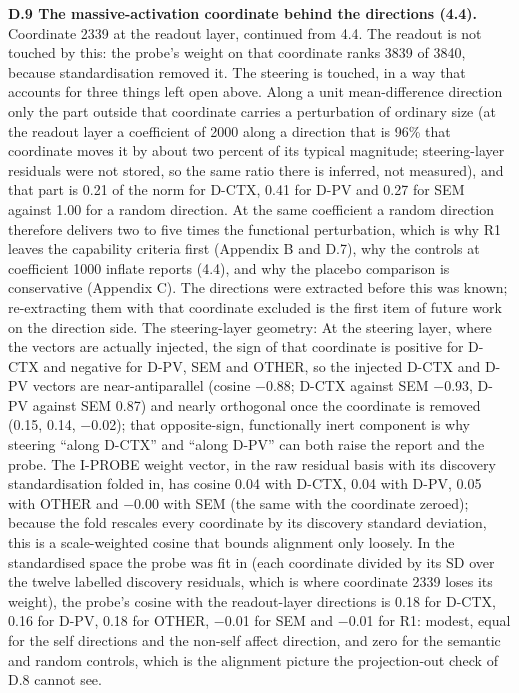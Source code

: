 \documentclass[11pt,a4paper]{article}
\begin{document}
\textbf{D.9 The massive-activation coordinate behind the directions (4.4).} Coordinate 2339 at the readout layer, continued from 4.4. The readout is not touched by this: the probe's weight on that coordinate ranks 3839 of 3840, because standardisation removed it. The steering is touched, in a way that accounts for three things left open above. Along a unit mean-difference direction only the part outside that coordinate carries a perturbation of ordinary size (at the readout layer a coefficient of 2000 along a direction that is 96\% that coordinate moves it by about two percent of its typical magnitude; steering-layer residuals were not stored, so the same ratio there is inferred, not measured), and that part is 0.21 of the norm for D-CTX, 0.41 for D-PV and 0.27 for SEM against 1.00 for a random direction. At the same coefficient a random direction therefore delivers two to five times the functional perturbation, which is why R1 leaves the capability criteria first (Appendix B and D.7), why the controls at coefficient 1000 inflate reports (4.4), and why the placebo comparison is conservative (Appendix C). The directions were extracted before this was known; re-extracting them with that coordinate excluded is the first item of future work on the direction side. The steering-layer geometry: At the steering layer, where the vectors are actually injected, the sign of that coordinate is positive for D-CTX and negative for D-PV, SEM and OTHER, so the injected D-CTX and D-PV vectors are near-antiparallel (cosine $-$0.88; D-CTX against SEM $-$0.93, D-PV against SEM 0.87) and nearly orthogonal once the coordinate is removed (0.15, 0.14, $-$0.02); that opposite-sign, functionally inert component is why steering ``along D-CTX'' and ``along D-PV'' can both raise the report and the probe. The I-PROBE weight vector, in the raw residual basis with its discovery standardisation folded in, has cosine 0.04 with D-CTX, 0.04 with D-PV, 0.05 with OTHER and $-$0.00 with SEM (the same with the coordinate zeroed); because the fold rescales every coordinate by its discovery standard deviation, this is a scale-weighted cosine that bounds alignment only loosely. In the standardised space the probe was fit in (each coordinate divided by its SD over the twelve labelled discovery residuals, which is where coordinate 2339 loses its weight), the probe's cosine with the readout-layer directions is 0.18 for D-CTX, 0.16 for D-PV, 0.18 for OTHER, $-$0.01 for SEM and $-$0.01 for R1: modest, equal for the self directions and the non-self affect direction, and zero for the semantic and random controls, which is the alignment picture the projection-out check of D.8 cannot see.
\end{document}
